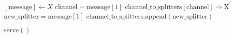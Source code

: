 \documentclass{article}
\begin{document}
\pagestyle{empty}

\newcommand{\send}{\Rightarrow}
\newcommand{\sendto}{\rightarrow}
\newcommand{\recv}{\Leftarrow}
\algrenewcommand\textproc{\textrm}

\begin{algorithmic}

  \algrenewcommand{}
  
  \algrenewcommand{}
  \State $[\text{message}] \gets X$
  \State $\text{channel} = \text{message}[1]$
  \State $\text{channel\_to\_splitters}[\text{channel}] \send \text{X}$
  \Else {}
  \State $\text{new\_splitter} = \text{message}[1]$
  \State $\text{channel\_to\_splitters}.\text{append}(\text{new\_splitter})$
  \EndIf
  \EndIf
  \EndWhile
  \EndProcedure

  \State $\text{serve}()$
  \EndFunction
  
  \EndProcedure
\end{algorithmic}
\end{document}
